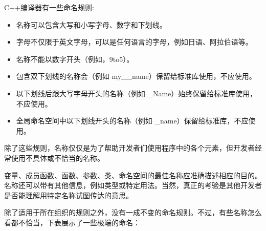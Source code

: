 
C++编译器有一些命名规则:

\begin{itemize}
\item
名称可以包含大写和小写字母、数字和下划线。

\item
字母不仅限于英文字母，可以是任何语言的字母，例如日语、阿拉伯语等。

\item
名称不能以数字开头（例如，9to5）。

\item
包含双下划线的名称会（例如 my\_\_name）保留给标准库使用，不应使用。

\item
以下划线后跟大写字母开头的名称（例如 \_Name）始终保留给标准库使用，不应使用。

\item
全局命名空间中以下划线开头的名称（例如 \_name）保留给标准库，不应使用。
\end{itemize}

除了这些规则，名称仅仅是为了帮助开发者们使用程序中的各个元素，但开发者经常使用不具体或不恰当的名称。


变量、成员函数、函数、参数、类、命名空间的最佳名称应准确描述相应的目的。名称还可以带有其他信息，例如类型或特定用法。当然，真正的考验是其他开发者是否能理解用特定名称试图传达的意思。

除了适用于所在组织的规则之外，没有一成不变的命名规则。不过，有些名称怎么看都不恰当，下表展示了一些极端的命名：


